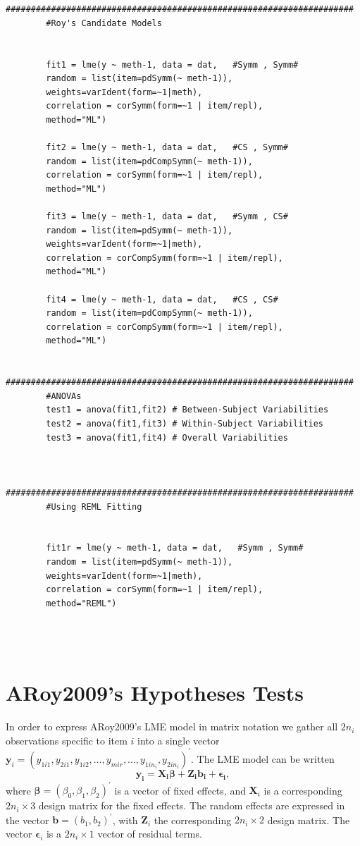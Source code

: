 \documentclass[12pt, a4paper]{report}
\theoremstyle{plain}
\theoremstyle{definition}
\theoremstyle{remark}
\begin{document}
	\begin{framed}	\begin{verbatim}
		
		#####################################################################
		#Roy's Candidate Models
		
		
		fit1 = lme(y ~ meth-1, data = dat,   #Symm , Symm#
		random = list(item=pdSymm(~ meth-1)), 
		weights=varIdent(form=~1|meth),
		correlation = corSymm(form=~1 | item/repl), 
		method="ML")
		
		fit2 = lme(y ~ meth-1, data = dat,   #CS , Symm#
		random = list(item=pdCompSymm(~ meth-1)),
		correlation = corSymm(form=~1 | item/repl), 
		method="ML")
		
		fit3 = lme(y ~ meth-1, data = dat,   #Symm , CS# 
		random = list(item=pdSymm(~ meth-1)),
		weights=varIdent(form=~1|meth), 
		correlation = corCompSymm(form=~1 | item/repl), 
		method="ML")
		
		fit4 = lme(y ~ meth-1, data = dat,   #CS , CS# 
		random = list(item=pdCompSymm(~ meth-1)), 
		correlation = corCompSymm(form=~1 | item/repl), 
		method="ML")
		
		#####################################################################
		#ANOVAs
		test1 = anova(fit1,fit2) # Between-Subject Variabilities
		test2 = anova(fit1,fit3) # Within-Subject Variabilities
		test3 = anova(fit1,fit4) # Overall Variabilities
		
		
		#####################################################################
		#Using REML Fitting
		
		
		fit1r = lme(y ~ meth-1, data = dat,   #Symm , Symm#
		random = list(item=pdSymm(~ meth-1)), 
		weights=varIdent(form=~1|meth),
		correlation = corSymm(form=~1 | item/repl), 
		method="REML")
		
		
		
		\end{verbatim}
	\end{framed}
	\newpage

	\section{ARoy2009's Hypotheses Tests}
	
	In order to express ARoy2009's LME model in matrix notation we gather all $2n_i$ observations specific to item $i$ into a single vector  $\boldsymbol{y}_{i} = (y_{1i1},y_{2i1},y_{1i2},\ldots,y_{mir},\ldots,y_{1in_{i}},y_{2in_{i}})^\prime.$ The LME model can be written
	\[
	\boldsymbol{y_{i}} = \boldsymbol{X_{i}\beta} + \boldsymbol{Z_{i}b_{i}} + \boldsymbol{\epsilon_{i}},
	\]
	where $\boldsymbol{\beta}=(\beta_0,\beta_1,\beta_2)^\prime$ is a vector of fixed effects, and $\boldsymbol{X}_i$ is a corresponding $2n_i\times 3$ design matrix for the fixed effects. The random effects are expressed in the vector $\boldsymbol{b}=(b_1,b_2)^\prime$, with $\boldsymbol{Z}_i$ the corresponding $2n_i\times 2$ design matrix. The vector $\boldsymbol{\epsilon}_i$ is a $2n_i\times 1$ vector of residual terms.
	
\end{document}
